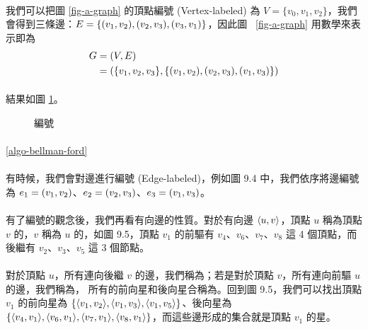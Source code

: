 \documentclass[12pt,a4paper,oneside]{report}
\begin{document}
\begin{CJK}{UTF8}{bkai}
\paragraph{}我們可以把圖 \ref{fig-a-graph} 的頂點編號 (Vertex-labeled) 為 $V=\{v_0,v_1,v_2\}$，我們會得到三條邊：$E=\{({v_1},{v_2}),({v_2},{v_3}),({v_3},{v_1})\}$，因此圖 ~\ref{fig-a-graph} 用數學來表示即為
\begin{align*}
G&=(V,E)\\
 &=(\{v_1,v_2,v_3\},\{({v_1},{v_2}),({v_2},{v_3}),({v_1},{v_3})\})
\end{align*}
\paragraph{}結果如圖 \ref{fig-label-a-graph}。
\begin{figure}[h!]
\centering
\label{fig-label-a-graph}
\caption{編號}
\end{figure}
\paragraph{}\ref{algo-bellman-ford}
\paragraph{}有時候，我們會對邊進行編號 (Edge-labeled)，例如圖 9.4 中，我們依序將邊編號為 $e_1=({v_1},{v_2})$、$e_2=({v_2},{v_3})$、$e_3=({v_1},{v_3})$。
\paragraph{}有了編號的觀念後，我們再看有向邊的性質。對於有向邊 $\langle{}{{u},{v}}\rangle{}$，頂點 $u$ 稱為頂點 $v$ 的，$v$ 稱為 $u$ 的，如圖 9.5，頂點 $v_1$ 的前驅有 $v_4$、$v_6$、$v_7$、$v_8$ 這 4 個頂點，而後繼有 $v_2$、$v_3$、$v_5$ 這 3 個節點。
\paragraph{}對於頂點 $u$，所有連向後繼 $v$ 的邊，我們稱為；若是對於頂點 $v$，所有連向前驅 $u$ 的邊，我們稱為， 所有的前向星和後向星合稱為。回到圖 9.5，我們可以找出頂點 $v_1$ 的前向星為 $\{\langle{}{{v_1},{v_2}}\rangle{},\langle{}{{v_1},{v_3}}\rangle{},\langle{}{{v_1},{v_5}}\rangle{}\}$、後向星為 $\{{\langle{}{{v_4},{v_1}}\rangle{},\langle{}{{v_6},{v_1}}\rangle{},\langle{}{{v_7},{v_1}}\rangle{},\langle{}{{v_8},{v_1}}\rangle{}}\}$，而這些邊形成的集合就是頂點 $v_1$ 的星。


\end{CJK}
\end{document}
